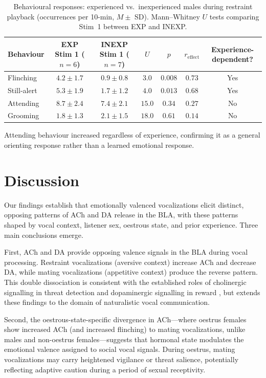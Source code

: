 \documentclass[11pt]{article}
\begin{document}
\begin{table}[H]
\centering
\caption{Behavioural responses: experienced vs.\ inexperienced males during restraint playback (occurrences per 10-min, $M \pm$ SD). Mann--Whitney $U$ tests comparing Stim~1 between EXP and INEXP.}
\label{tab:behav_exp}
\begin{tabular}{lcccccc}
\toprule
Behaviour & EXP Stim 1 ($n = 6$) & INEXP Stim 1 ($n = 7$) & $U$ & $p$ & $r_{\mathrm{effect}}$ & Experience-dependent? \\
\midrule
Flinching & $4.2 \pm 1.7$ & $0.9 \pm 0.8$ & $3.0$ & $0.008$ & $0.73$ & Yes \\
Still-alert & $5.3 \pm 1.9$ & $1.7 \pm 1.2$ & $4.0$ & $0.013$ & $0.68$ & Yes \\
Attending & $8.7 \pm 2.4$ & $7.4 \pm 2.1$ & $15.0$ & $0.34$ & $0.27$ & No \\
Grooming & $1.8 \pm 1.3$ & $2.1 \pm 1.5$ & $18.0$ & $0.61$ & $0.14$ & No \\
\bottomrule
\end{tabular}
\end{table}

Attending behaviour increased regardless of experience, confirming it as a general orienting response rather than a learned emotional response.

\section{Discussion}

Our findings establish that emotionally valenced vocalizations elicit distinct, opposing patterns of ACh and DA release in the BLA, with these patterns shaped by vocal context, listener sex, oestrous state, and prior experience. Three main conclusions emerge.

First, ACh and DA provide opposing valence signals in the BLA during vocal processing. Restraint vocalizations (aversive context) increase ACh and decrease DA, while mating vocalizations (appetitive context) produce the reverse pattern. This double dissociation is consistent with the established roles of cholinergic signalling in threat detection \citep{hasselmo2006role, jiang2013cholinergic} and dopaminergic signalling in reward \citep{schultz1997neural, wise2004dopamine}, but extends these findings to the domain of naturalistic vocal communication.

Second, the oestrous-state-specific divergence in ACh---where oestrus females show increased ACh (and increased flinching) to mating vocalizations, unlike males and non-oestrus females---suggests that hormonal state modulates the emotional valence assigned to social vocal signals. During oestrus, mating vocalizations may carry heightened vigilance or threat salience, potentially reflecting adaptive caution during a period of sexual receptivity.
\end{document}
